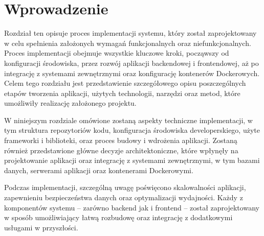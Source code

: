 \section{Wprowadzenie}
Rozdział ten opisuje proces implementacji systemu, który został zaprojektowany w celu spełnienia założonych wymagań funkcjonalnych oraz niefunkcjonalnych. Proces implementacji obejmuje wszystkie kluczowe kroki, począwszy od konfiguracji środowiska, przez rozwój aplikacji backendowej i frontendowej, aż po integrację z systemami zewnętrznymi oraz konfigurację kontenerów Dockerowych. Celem tego rozdziału jest przedstawienie szczegółowego opisu poszczególnych etapów tworzenia aplikacji, użytych technologii, narzędzi oraz metod, które umożliwiły realizację założonego projektu.

W niniejszym rozdziale omówione zostaną aspekty techniczne implementacji, w tym struktura repozytoriów kodu, konfiguracja środowiska developerskiego, użyte frameworki i biblioteki, oraz proces budowy i wdrożenia aplikacji. Zostaną również przedstawione główne decyzje architektoniczne, które wpłynęły na projektowanie aplikacji oraz integrację z systemami zewnętrznymi, w tym bazami danych, serwerami aplikacji oraz kontenerami Dockerowymi.

Podczas implementacji, szczególną uwagę poświęcono skalowalności aplikacji, zapewnieniu bezpieczeństwa danych oraz optymalizacji wydajności. Każdy z komponentów systemu – zarówno backend jak i frontend – został zaprojektowany w sposób umożliwiający łatwą rozbudowę oraz integrację z dodatkowymi usługami w przyszłości.